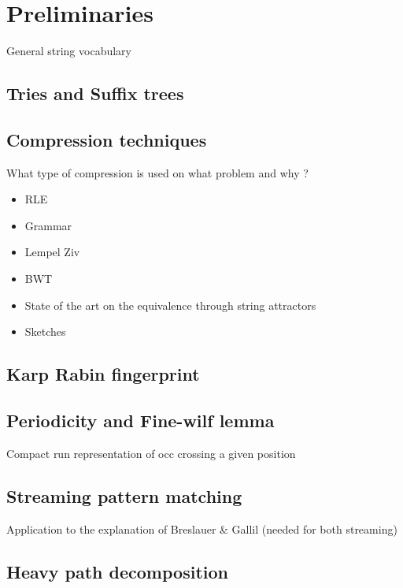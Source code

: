 \chapter*{Preliminaries}

General string vocabulary


\section{Tries and Suffix trees}

\section{Compression techniques}
What type of compression is used on what problem and why ?
\begin{itemize}
\item RLE
\item Grammar
\item Lempel Ziv
\item BWT
\item State of the art on the equivalence through string attractors
\item Sketches
\end{itemize}


\section{Karp Rabin fingerprint} 
\section{Periodicity and Fine-wilf lemma}
Compact run representation of occ crossing a given position

\section{Streaming pattern matching}
Application to the explanation of Breslauer \& Gallil (needed for both streaming)

\section{Heavy path decomposition}